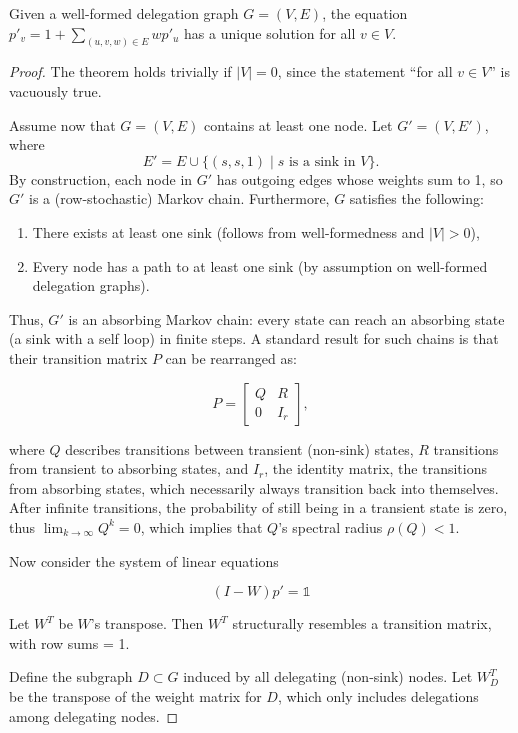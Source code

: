\begin{theorem}
Given a well-formed delegation graph $G=(V, E)$, the equation $p'_v = 1 + \sum_{(u, v, w) \in E} wp'_u$ has a unique solution for all $v \in V$.
\end{theorem}
\begin{proof}

The theorem holds trivially if $|V| = 0$, since the statement “for all $v \in V$” is vacuously true.

Assume now that $G = (V, E)$ contains at least one node. Let $G' = (V, E')$, where
\[
E' = E \cup \{(s, s, 1) \mid s \text{ is a sink in } V\}.
\]
By construction, each node in $G'$ has outgoing edges whose weights sum to 1, so $G'$ is a (row-stochastic) Markov chain. Furthermore, $G$ satisfies the following:

\begin{enumerate}
\item There exists at least one sink (follows from well-formedness and $|V| > 0$),
\item Every node has a path to at least one sink (by assumption on well-formed delegation graphs).
\end{enumerate}

Thus, $G'$ is an absorbing Markov chain: every state can reach an absorbing state (a sink with a self loop) in finite steps. A standard result for such chains is that their transition matrix $P$ can be rearranged as:

\[
P = \begin{bmatrix}
Q & R \\
0 & I_r
\end{bmatrix},
\]

where $Q$ describes transitions between transient (non-sink) states, $R$ transitions from transient to absorbing states, and $I_r$, the identity matrix, the transitions from absorbing states, which necessarily always transition back into themselves. After infinite transitions, the probability of still being in a transient state is zero, thus $\lim_{k \to \infty} Q^k = 0$, which implies that $Q$'s spectral radius $\rho(Q) < 1$.

Now consider the system of linear equations

\[
(I - W)p' = \mathbb{1}
\]

Let $W^T$ be $W$'s transpose. Then $W^T$ structurally resembles a transition matrix, with row sums = 1.

Define the subgraph $D \subset G$ induced by all delegating (non-sink) nodes. Let $W_D^T$ be the transpose of the weight matrix for $D$, which only includes delegations among delegating nodes. 


\end{proof}
